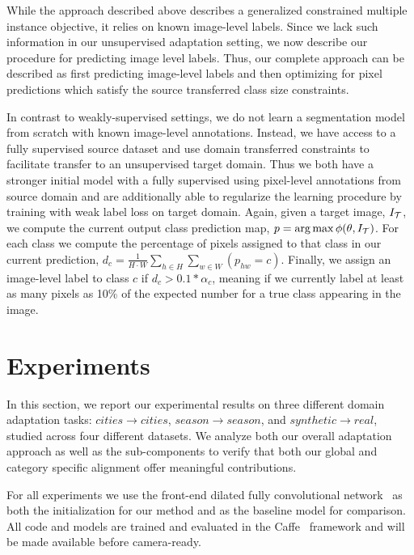 \documentclass[10pt,twocolumn,letterpaper]{article}
\begin{document}
While the approach described above describes a generalized constrained multiple instance objective, it relies on known image-level labels. Since we lack such information in our unsupervised adaptation setting, we now describe our procedure for predicting image level labels. Thus, our complete approach can be described as first predicting image-level labels and then optimizing for pixel predictions which satisfy the source transferred class size constraints. 

In contrast to weakly-supervised settings, we do not learn a segmentation model from scratch with known image-level annotations. Instead, we have access to a fully supervised source dataset and use domain transferred constraints to facilitate transfer to an unsupervised target domain. Thus we both have a stronger initial model with a fully supervised using pixel-level annotations from source domain and are additionally able to regularize the learning procedure by training with weak label loss on target domain.
Again, given a target image, ${I}_{\mathcal{T}}$, we compute the current output class prediction map, $p = \arg\max\phi(\theta, {I}_{\mathcal{T}})$. For each class we compute the percentage of pixels assigned to that class in our current prediction, $d_c = \frac{1}{H\cdot W}\sum_{h \in H} \sum_{w\in W} (p_{hw} = c)$. Finally, we assign an image-level label to class $c$ if $d_c > 0.1 * \alpha_c$, meaning if we currently label at least as many pixels as 10\% of the expected number for a true class appearing in the image.



















%
 \label{sec:experiments}
\section{Experiments}
In this section, we report our experimental results on three different domain adaptation tasks: $cities\rightarrow cities$, $season\rightarrow season$, and $synthetic\rightarrow real$, studied across four different datasets. We analyze both our overall adaptation approach as well as the sub-components to verify that both our global and category specific alignment offer meaningful contributions.

For all experiments we use the front-end dilated fully convolutional network~\cite{yu2016multi} as both the initialization for our method and as the baseline model for comparison. All code and models are trained and evaluated in the  Caffe~\cite{jia2014caffe} framework and will be made available before camera-ready.
\end{document}
